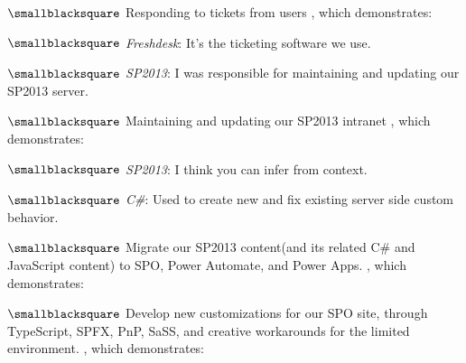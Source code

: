 \documentclass[10mm,letterpaper,notitlepage]{article}
\begin{document}
{{							\nopagebreak
									{\color[RGB]{0, 0, 0}
									\fontsize{2.25mm}{3.0mm}\selectfont
									$\smallblacksquare$
									Responding to tickets from users
									, which demonstrates:
										\setlength{\parindent}{\parindent+4mm}
										
										\nopagebreak
										$\smallblacksquare$ \textit{Freshdesk}: It's the ticketing software we use.
										
										$\smallblacksquare$ \textit{SP2013}: I was responsible for maintaining and updating our SP2013 server.
										
										\setlength{\parindent}{\parindent-4mm}
									\par}
									{\color[RGB]{0, 0, 0}
									\fontsize{2.25mm}{3.0mm}\selectfont
									$\smallblacksquare$
									Maintaining and updating our SP2013 intranet
									, which demonstrates:
										\setlength{\parindent}{\parindent+4mm}
										
										\nopagebreak
										$\smallblacksquare$ \textit{SP2013}: I think you can infer from context.
										
										$\smallblacksquare$ \textit{C\#}: Used to create new and fix existing server side custom behavior.
										
										\setlength{\parindent}{\parindent-4mm}
									\par}
									{\color[RGB]{0, 0, 0}
									\fontsize{2.25mm}{3.0mm}\selectfont
									$\smallblacksquare$
									Migrate our SP2013 content(and its related C\# and JavaScript content) to SPO, Power Automate, and Power Apps.
									, which demonstrates:
										\setlength{\parindent}{\parindent+4mm}
										
										\nopagebreak
										\setlength{\parindent}{\parindent-4mm}
									\par}
									{\color[RGB]{0, 0, 0}
									\fontsize{2.25mm}{3.0mm}\selectfont
									$\smallblacksquare$
									Develop new customizations for our SPO site, through TypeScript, SPFX, PnP, SaSS, and creative workarounds for the limited environment.
									, which demonstrates:
										\setlength{\parindent}{\parindent+4mm}
										
}}}
\end{document}
